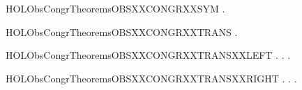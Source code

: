 \newcommand{\HOLObsCongrTheoremsOBSXXCONGRXXSUBSTXXSUMXXR}{\UseVerbatim{HOLObsCongrTheoremsOBSXXCONGRXXSUBSTXXSUMXXR}}
\begin{SaveVerbatim}{HOLObsCongrTheoremsOBSXXCONGRXXSYM}
\HOLTokenTurnstile{} \HOLSymConst{\HOLTokenForall{}} .    \HOLSymConst{\HOLTokenImp{}}   
\end{SaveVerbatim}
\newcommand{\HOLObsCongrTheoremsOBSXXCONGRXXSYM}{\UseVerbatim{HOLObsCongrTheoremsOBSXXCONGRXXSYM}}
\begin{SaveVerbatim}{HOLObsCongrTheoremsOBSXXCONGRXXTRANS}
\HOLTokenTurnstile{} \HOLSymConst{\HOLTokenForall{}}  .
          \HOLSymConst{\HOLTokenConj{}}    \HOLSymConst{\HOLTokenImp{}}   
\end{SaveVerbatim}
\newcommand{\HOLObsCongrTheoremsOBSXXCONGRXXTRANS}{\UseVerbatim{HOLObsCongrTheoremsOBSXXCONGRXXTRANS}}
\begin{SaveVerbatim}{HOLObsCongrTheoremsOBSXXCONGRXXTRANSXXLEFT}
\HOLTokenTurnstile{} \HOLSymConst{\HOLTokenForall{}} .
          \HOLSymConst{\HOLTokenImp{}}
       \HOLSymConst{\HOLTokenForall{}} .  \HOLTokenTransBegin{}\HOLTokenTransEnd {} \HOLSymConst{\HOLTokenImp{}} \HOLSymConst{\HOLTokenExists{}}.  \HOLTokenWeakTransBegin{}\HOLTokenWeakTransEnd {} \HOLSymConst{\HOLTokenConj{}}   
\end{SaveVerbatim}
\newcommand{\HOLObsCongrTheoremsOBSXXCONGRXXTRANSXXLEFT}{\UseVerbatim{HOLObsCongrTheoremsOBSXXCONGRXXTRANSXXLEFT}}
\begin{SaveVerbatim}{HOLObsCongrTheoremsOBSXXCONGRXXTRANSXXRIGHT}
\HOLTokenTurnstile{} \HOLSymConst{\HOLTokenForall{}} .
          \HOLSymConst{\HOLTokenImp{}}
       \HOLSymConst{\HOLTokenForall{}} .  \HOLTokenTransBegin{}\HOLTokenTransEnd {} \HOLSymConst{\HOLTokenImp{}} \HOLSymConst{\HOLTokenExists{}}.  \HOLTokenWeakTransBegin{}\HOLTokenWeakTransEnd {} \HOLSymConst{\HOLTokenConj{}}   
\end{SaveVerbatim}

